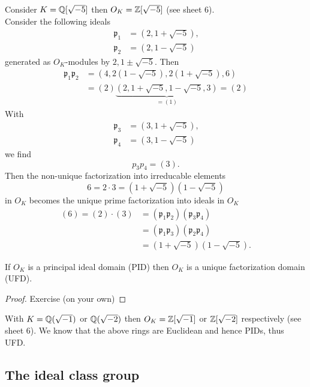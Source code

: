 \documentclass[NumTh.tex]{subfiles}
\begin{document}
\begin{ex}
  Consider $K = \mathbb{Q}[\sqrt{-5}]$ then $O_K = \mathbb{Z}[\sqrt{-5}]$ (see sheet 6).\\
  Consider the following ideals
  \begin{align*}
    \mathfrak{p}_1 &= (2, 1 + \sqrt{-5}) \text{,} \\
    \mathfrak{p}_2 &= (2, 1 - \sqrt{-5})
  \end{align*}
  generated as $O_K$-modules by $2, 1 \pm \sqrt{-5}$. Then 
  \begin{align*}
    \mathfrak{p}_1 \mathfrak{p}_2 &= (4, 2 (1 - \sqrt{-5}), 2 (1+ \sqrt{-5}), 6) \\
    &= (2) \underbrace{(2, 1 + \sqrt{-5}, 1 - \sqrt{-5}, 3)}_{ = (1)} = (2)
  \end{align*}
  With 
  \begin{align*}
  \mathfrak{p}_3 &= (3, 1 + \sqrt{-5}) \text{,} \\
  \mathfrak{p}_4 &= (3, 1 - \sqrt{-5})
  \end{align*}
  we find 
  \[ p_3 p_4 = (3) \text{.} \]
  Then the non-unique factorization into irreducable elements
  \[ 6 = 2 \cdot 3 = (1 + \sqrt{-5}) (1 - \sqrt{-5}) \]
  in $O_K$ becomes the unique prime factorization into ideals in $O_K$
  \begin{align*}
    (6) = (2) \cdot (3) &= (\mathfrak{p}_1 \mathfrak{p}_2) (\mathfrak{p}_3 \mathfrak{p}_4) \\
    &= (\mathfrak{p}_1 \mathfrak{p}_3) (\mathfrak{p}_2 \mathfrak{p}_4) \\
    &= (1 + \sqrt{-5}) (1 - \sqrt{-5}) \text{.}
  \end{align*}
\end{ex}

\begin{cor}\label{cor_3_3_7}
  If $O_K$ is a principal ideal domain (PID) then $O_K$ is a unique factorization domain (UFD).
\end{cor}

\begin{proof}
  Exercise (on your own)
\end{proof}

\begin{ex}
  With $K = \mathbb{Q}(\sqrt{-1})$ or $\mathbb{Q}(\sqrt{-2})$ then $O_K = \mathbb{Z}[\sqrt{-1}]$ or $\mathbb{Z}[\sqrt{-2}]$ respectively (see sheet 6).
  We know that the above rings are Euclidean and hence PIDs, thus UFD.
\end{ex}


\subsection{The ideal class group}
\end{document}
